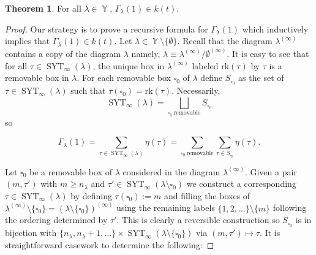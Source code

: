 \documentclass[12pt,reqno]{amsart}
\theoremstyle{definition}
\newtheorem{thm}{Theorem}[section]
\DeclareMathOperator{\SYT}{\mathrm{SYT}}
\DeclareMathOperator{\Par}{\mathbb{Y}}
\begin{document}
\begin{thm}\label{rationality thm}
    For all $\lambda \in \Par$, $\Gamma_{\lambda}(1) \in k(t).$ 
\end{thm}
\begin{proof}
    Our strategy is to prove a recursive formula for $\Gamma_{\lambda}(1)$ which inductively implies that $\Gamma_{\lambda}(1) \in k(t)$. Let $\lambda \in \Par \setminus \{\emptyset\}.$ Recall that the diagram $\lambda^{(\infty)}$ contains a copy of the diagram $\lambda$ namely, $\lambda \equiv \lambda^{(\infty)}/\emptyset^{(\infty)}$. It is easy to see that for all $\tau \in \SYT_{\infty}(\lambda)$, the unique box in $\lambda^{(\infty)}$ labeled $\mathrm{rk}(\tau)$ by $\tau$ is a removable box in $\lambda$. For each removable box $\square_{0}$ of $\lambda$ define $S_{\square_{0}}$ as the set of $\tau \in \SYT_{\infty}(\lambda)$ such that $\tau(\square_0) = \mathrm{rk}(\tau).$ Necessarily,
    $$\SYT_{\infty}(\lambda) = \bigsqcup_{\square_0~ \text{removable}} S_{\square_0}$$ so 

    $$\Gamma_{\lambda}(1) = \sum_{\tau \in \SYT_{\infty}(\lambda)} \eta(\tau) = \sum_{\square_0~ \text{removable}} \sum_{\tau\in S_{\square_0}} \eta(\tau).$$ 

    Let $\square_0$ be a removable box of $\lambda$ considered in the diagram $\lambda^{(\infty)}$. Given a pair $(m,\tau')$ with $m\geq n_{\lambda}$ and $\tau' \in \SYT_{\infty}(\lambda \setminus \square_0)$ we construct a corresponding $\tau\in \SYT_{\infty}(\lambda)$ by defining $\tau(\square_0) := m$ and filling the boxes of $\lambda^{(\infty)}\setminus \{\square_0\} = (\lambda\setminus \{\square_0\})^{(\infty)}$ using the remaining labels $\{1,2,\dots\} \setminus \{m\}$ following the ordering determined by $\tau'.$ This is clearly a reversible construction so $S_{\square_0}$ is in bijection with $\{n_{\lambda},n_{\lambda}+1,\dots\} \times \SYT_{\infty}(\lambda \setminus \{\square_0\})$ via $(m,\tau') \mapsto \tau.$ It is straightforward casework to determine the following:


\end{proof}
\end{document}
